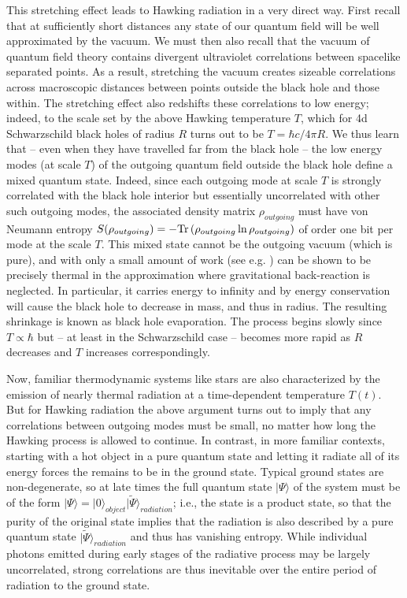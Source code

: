\documentclass[10pt]{article}
\begin{document}
This stretching effect leads to Hawking radiation in a very direct way.  First recall that at sufficiently short distances any state of our quantum field will be well approximated by the vacuum.  We must then also recall that the vacuum of quantum field theory contains divergent ultraviolet correlations between spacelike separated points.  As a result, stretching the vacuum creates sizeable correlations across macroscopic distances between points outside the black hole and those within.  The stretching effect also redshifts these correlations to low energy; indeed, to the scale set by the above Hawking temperature $T$, which for 4d Schwarzschild black holes of radius $R$ turns out to be $T=\hbar c/4\pi R$.  We thus learn that -- even when they have travelled far from the black hole -- the low energy modes (at scale $T$) of the outgoing quantum field outside the black hole define a mixed quantum state.  Indeed, since each outgoing mode at scale $T$ is strongly correlated with the black hole interior but essentially uncorrelated with other such outgoing modes, the associated density matrix $\rho_{outgoing}$ must have von Neumann entropy $S(\rho_{outgoing}) = -{\rm Tr} \left( \rho_{outgoing} \ln \rho_{outgoing} \right)$ of order one bit per mode at the scale $T$. This mixed state cannot be the outgoing vacuum (which is pure), and with only a small amount of work (see e.g. \cite{Jacobson:2003vx}) can be shown to be precisely thermal in the approximation where gravitational back-reaction is neglected.    In particular, it carries energy to infinity and by energy conservation will cause the black hole to decrease in mass, and thus in radius.  The resulting shrinkage is known as black hole evaporation.  The process begins slowly since $T \propto \hbar$ but -- at least in the Schwarzschild case -- becomes more rapid as $R$ decreases and $T$ increases correspondingly.

Now, familiar thermodynamic systems like stars are also characterized by the emission of nearly thermal radiation at a time-dependent temperature $T(t)$.  But for Hawking radiation the above argument turns out to imply that any correlations between outgoing modes must be small, no matter how long the Hawking process is allowed to continue.  In contrast, in more familiar contexts, starting with a hot object in a pure quantum state and letting it radiate all of its energy forces the remains to be in the ground state.  Typical ground states are non-degenerate, so at late times the full quantum state $|\Psi\rangle$ of the system must be of the form $|\Psi\rangle = |0\rangle_{object} |\tilde \Psi\rangle_{radiation}$; i.e., the state is a product state, so that the purity of the original state implies that the radiation is also described by a pure quantum state $|\tilde \Psi\rangle_{radiation}$ and thus has vanishing entropy.  While individual photons emitted during early stages of the radiative process may be largely uncorrelated, strong correlations are thus inevitable over the entire period of radiation to the ground state.
\end{document}
